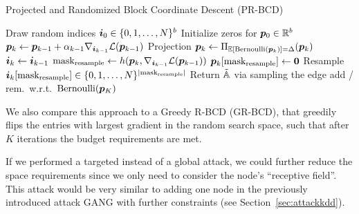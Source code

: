 \documentclass[letterpaper]{article} %
\begin{document}
\begin{algorithm}[h]
    \small
	\caption{Projected and Randomized Block Coordinate Descent (PR-BCD)}
	\label{algo:prbcd}
	\begin{algorithmic}[1]
	\STATE Draw random indices \({\bm{i}}_0 \in \{0, 1, \dots, N\}^b\)
	\STATE Initialize zeros for \({\bm{p}}_0 \in \mathbb{R}^b\)
	    \STATE \({\bm{p}}_{k} \leftarrow {\bm{p}}_{k-1} + \alpha_{k-1} \nabla_{{\bm{i}}_{k-1}} \mathcal{L}({\bm{p}}_{k-1})\)
	    \STATE Projection \({\bm{p}}_{k} \leftarrow \Pi_{\mathbb{E}[\text{Bernoulli}({\bm{p}}_k)] = \Delta} ({\bm{p}}_{k})\)
	    \STATE \({\bm{i}}_{k} \leftarrow {\bm{i}}_{k-1}\)
	        \STATE \(\text{mask}_{\text{resample}} \leftarrow h({\bm{p}}_{k}, \nabla_{{\bm{i}}_{k-1}} \mathcal{L}({\bm{p}}_{k-1}))\)
	        \STATE \({\bm{p}}_k[\text{mask}_{\text{resample}}] \leftarrow \mathbf{0}\)
	        \STATE Resample \({\bm{i}}_{k}[\text{mask}_{\text{resample}}] \in \{0, 1, \dots, N\}^{|\text{mask}_{\text{resample}}|}\)
	    \ENDIF
	\ENDFOR
    \STATE Return \(\tilde{{\mathbb{A}}}\) via sampling the edge add / rem.~w.r.t.~\(\text{Bernoulli}({\bm{p}}_{K})\) 
	\end{algorithmic}
\end{algorithm}

We also compare this approach to a Greedy R-BCD (GR-BCD), that greedily flips the entries with largest gradient in the random search space, such that after \(K\) iterations the budget requirements are met.

If we performed a targeted instead of a global attack, we could further reduce the space requirements since we only need to consider the node's ``receptive field''. This attack would be very similar to adding one node in the previously introduced attack GANG with further constraints (see Section~\ref{sec:attackkdd}).
\end{document}
